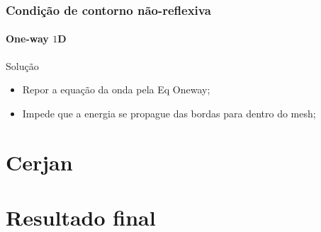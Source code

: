 \documentclass[10pt]{beamer} %
\begin{document}
\begin{frame}
	\frametitle{Condição de contorno não-reflexiva}
	\framesubtitle{One-way $1$D}
	\begin{block}{Solução}
		\begin{itemize}
			\item Repor a equação da onda pela Eq Oneway;
			\pause 
			\item Impede que a energia se propague das bordas para dentro do mesh;
		\end{itemize}
	\end{block}
\end{frame}

\section{Cerjan}

\section{Resultado final}




%
%
%
%
\end{document}
